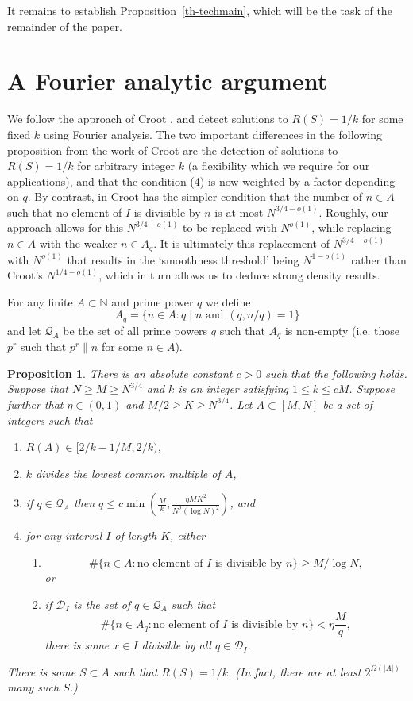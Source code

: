 \documentclass{amsart}
\newcommand{\bbn}{\mathbb{N}}
\newcommand{\abs}[1]{\left\lvert #1\right\rvert}
\newcommand{\brac}[1]{\left( #1\right)}
\newtheorem{proposition}{Proposition}
\begin{document}
It remains to establish Proposition~\ref{th-techmain}, which will be the task of the remainder of the paper.

\section{A Fourier analytic argument}
We follow the approach of Croot \cite{Cr2003}, and detect solutions to $R(S)=1/k$ for some fixed $k$ using Fourier analysis. The two important differences in the following proposition from the work of Croot are the detection of solutions to $R(S)=1/k$ for arbitrary integer $k$ (a flexibility which we require for our applications), and that the condition (4) is now weighted by a factor depending on $q$. By contrast, in \cite{Cr2003} Croot has the simpler condition that the number of $n\in A$ such that no element of $I$ is divisible by $n$ is at most $N^{3/4-o(1)}$. Roughly, our approach allows for this $N^{3/4-o(1)}$ to be replaced with $N^{o(1)}$, while replacing $n\in A$ with the weaker $n\in A_q$. It is ultimately this replacement of $N^{3/4-o(1)}$ with $N^{o(1)}$ that results in the `smoothness threshold' being $N^{1-o(1)}$ rather than Croot's $N^{1/4-o(1)}$, which in turn allows us to deduce strong density results.

For any finite $A\subset \bbn$ and prime power $q$ we define\label{def-aq}
\[A_q = \{ n\in A : q\mid n\textrm{ and }(q,n/q)=1\}\]
and let $\mathcal{Q}_A$ \label{def-qa} be the set of all prime powers $q$ such that $A_q$ is non-empty (i.e. those $p^r$ such that $p^r\| n$ for some $n\in A$). 

\begin{proposition}\label{prop-fourier}
There is an absolute constant $c>0$ such that the following holds. Suppose that $N\geq M\geq N^{3/4}$ and $k$ is an integer satisfying $1\leq k\leq cM$. Suppose further that $\eta\in(0,1)$ and $M/2\geq K\geq N^{3/4}$. Let $A\subset [M,N]$ be a set of integers such that
\begin{enumerate}
\item $R(A)\in [2/k-1/M,2/k)$,
\item $k$ divides the lowest common multiple of $A$,
\item if $q\in\mathcal{Q}_A$ then $q\leq c\min\brac{\frac{M}{k},\frac{\eta MK^2}{N^2(\log N)^2}}$,  and
\item for any interval $I$ of length $K$, either
\begin{enumerate}
\item \[\# \{ n\in A : \textrm{no element of }I\textrm{ is divisible by }n\}\geq M/\log N,\]
or
\item if $\mathcal{D}_I$ is the set of $q\in\mathcal{Q}_A$ such that
\[\#\{ n\in A_q: \textrm{no element of }I\textrm{ is divisible by }n\}<\eta \frac{M}{q},\]
there is some $x\in I$ divisible by all $q\in\mathcal{D}_I$.
\end{enumerate}
\end{enumerate}
There is some $S\subset A$ such that $R(S)=1/k$. (In fact, there are at least $2^{\Omega(\abs{A})}$ many such $S$.)
\end{proposition}
\end{document}
